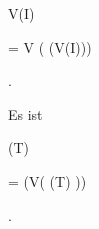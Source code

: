 {{{{\vergleichskette


{ V(I)
}


{ = }{ V ( (V(I)))
}


{  }{
}


{    }{
}


{   }{
}


}
{}{}{.}
}{Es ist


\mavergleichskette


{\vergleichskette


{  (T)
}


{ = }{  (V(  (T)  ))
}


{  }{
}


{    }{
}


{   }{
}


}
{}{}{.}
}}


\faktzusatz {}


\faktzusatz {}


}



